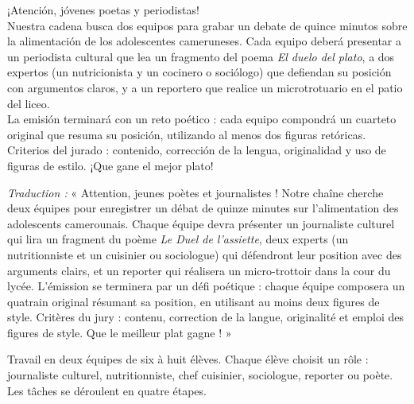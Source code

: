 \documentclass[11pt]{article}
\newcounter{popsec}
\newcounter{popsub}
\newcommand{\courssub}[1]{%
  \stepcounter{popsub}%
  \par\vspace{9pt}\noindent{\popxbold\fontsize{11.5}{13}\selectfont\color{popink}{\color{poporange}\thepopsec.\thepopsub}\hspace{6pt}#1}\par\nopagebreak\vspace{4pt}
}
\begin{document}
\begin{textebox}
¡Atención, jóvenes poetas y periodistas!\\
Nuestra cadena busca dos equipos para grabar un debate de quince minutos sobre la alimentación de los adolescentes cameruneses. Cada equipo deberá presentar a un periodista cultural que lea un fragmento del poema \emph{El duelo del plato}, a dos expertos (un nutricionista y un cocinero o sociólogo) que defiendan su posición con argumentos claros, y a un reportero que realice un microtrotuario en el patio del liceo.\\
La emisión terminará con un reto poético : cada equipo compondrá un cuarteto original que resuma su posición, utilizando al menos dos figuras retóricas.\\
Criterios del jurado : contenido, corrección de la lengua, originalidad y uso de figuras de estilo. ¡Que gane el mejor plato!
\end{textebox}

\emph{Traduction :} « Attention, jeunes poètes et journalistes ! Notre chaîne cherche deux équipes pour enregistrer un débat de quinze minutes sur l'alimentation des adolescents camerounais. Chaque équipe devra présenter un journaliste culturel qui lira un fragment du poème \emph{Le Duel de l'assiette}, deux experts (un nutritionniste et un cuisinier ou sociologue) qui défendront leur position avec des arguments clairs, et un reporter qui réalisera un micro-trottoir dans la cour du lycée. L'émission se terminera par un défi poétique : chaque équipe composera un quatrain original résumant sa position, en utilisant au moins deux figures de style. Critères du jury : contenu, correction de la langue, originalité et emploi des figures de style. Que le meilleur plat gagne ! »

\courssub{Consignes}

Travail en deux équipes de six à huit élèves. Chaque élève choisit un rôle : journaliste culturel, nutritionniste, chef cuisinier, sociologue, reporter ou poète. Les tâches se déroulent en quatre étapes.
\end{document}
